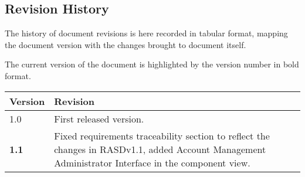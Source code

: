 \subsection{Revision History}

The history of document revisions is here recorded in tabular format, mapping
the document version with the changes brought to document itself.

The current version of the document is highlighted by the version number in bold
format.

\begin{longtable}{ |l|p{7cm}| }
  \hline
    \textbf{Version} & \textbf{Revision}\\
  \hline
    1.0 & First released version.\\
  \hline
  	\textbf{1.1} & Fixed requirements traceability section to reflect the
    changes in RASDv1.1, added Account Management Administrator Interface in the
    component view. \\
	\hline
\end{longtable}
~
